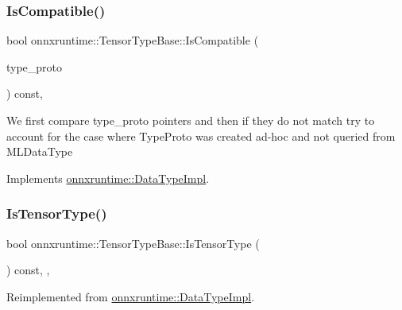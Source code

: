 \subsubsection{\texorpdfstring{Is\+Compatible()}{IsCompatible()}}
{\footnotesize\ttfamily bool onnxruntime\+::\+Tensor\+Type\+Base\+::\+Is\+Compatible (\begin{DoxyParamCaption}\item[{const O\+N\+N\+X\+\_\+\+N\+A\+M\+E\+S\+P\+A\+C\+E\+::\+Type\+Proto \&}]{type\+\_\+proto }\end{DoxyParamCaption}) const\hspace{0.3cm}{\ttfamily [override]}, {\ttfamily [virtual]}}

We first compare type\+\_\+proto pointers and then if they do not match try to account for the case where Type\+Proto was created ad-\/hoc and not queried from M\+L\+Data\+Type 

Implements \mbox{\hyperlink{classonnxruntime_1_1DataTypeImpl_a94b2c274bd74068291356c81515d69a1}{onnxruntime\+::\+Data\+Type\+Impl}}.

\mbox{\label{classonnxruntime_1_1TensorTypeBase_aca50ccc834e19c0e5e8bf15ecdaa7711}} 
\subsubsection{\texorpdfstring{Is\+Tensor\+Type()}{IsTensorType()}}
{\footnotesize\ttfamily bool onnxruntime\+::\+Tensor\+Type\+Base\+::\+Is\+Tensor\+Type (\begin{DoxyParamCaption}{ }\end{DoxyParamCaption}) const\hspace{0.3cm}{\ttfamily [inline]}, {\ttfamily [override]}, {\ttfamily [virtual]}}



Reimplemented from \mbox{\hyperlink{classonnxruntime_1_1DataTypeImpl_a9503fa09405fee812516567ebe7711a2}{onnxruntime\+::\+Data\+Type\+Impl}}.

\mbox{\label{classonnxruntime_1_1TensorTypeBase_a458c18e14ee5b23bf28497fad9cb01ba}} 
